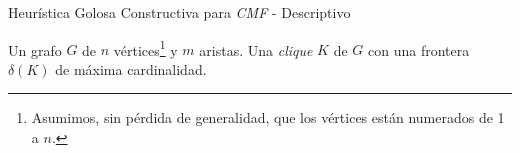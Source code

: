\begin{minipage}{\textwidth}%
    \begin{algorithm}[H]
        \caption{Heur\'istica Golosa Constructiva para \emph{CMF} - Descriptivo}
        \begin{algorithmic}[1]
            \Require Un grafo $G$ de $n$ v\'ertices\footnote{Asumimos, sin p\'erdida 
                de generalidad, que los v\'ertices est\'an numerados de 1 a $n$.}
                y $m$ aristas.
            \Ensure Una \emph{clique} $K$ de $G$ con una frontera 
                $\delta(K)$ de m\'axima cardinalidad.
            \Statex

            \State {}
        \end{algorithmic}
    \end{algorithm}
\end{minipage}
